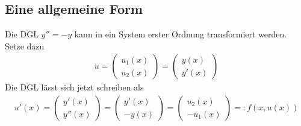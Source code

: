 \documentclass[
]{mycourse}
\begin{document}
\subsection{Eine allgemeine Form}


\begin{ex} \label{1.4}
	Die DGL $y'' = -y$ kann in ein System erster Ordnung transformiert werden.
	Setze dazu
	\begin{align*}
		u = \begin{pmatrix}
			u_1(x) \\ u_2(x)
		\end{pmatrix} = \begin{pmatrix}
			y(x) \\ y'(x)
		\end{pmatrix}
	\end{align*}
	Die DGL lässt sich jetzt schreiben als
	\begin{align*}
		u'(x) =
		\begin{pmatrix}
			y'(x) \\ y''(x)
		\end{pmatrix}
		= \begin{pmatrix}
			y'(x) \\ -y(x)
		\end{pmatrix}
		= \begin{pmatrix}
			u_2(x) \\ -u_1(x)
		\end{pmatrix}
		=: f(x, u(x))
	\end{align*}
\end{ex}
\end{document}
